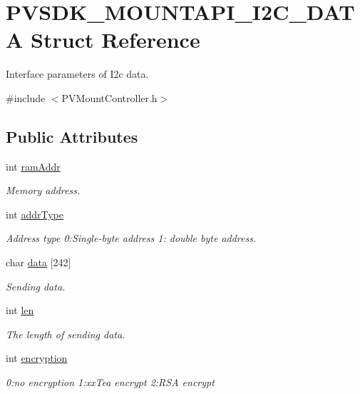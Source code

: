 \hypertarget{struct_p_v_s_d_k___m_o_u_n_t_a_p_i___i2_c___d_a_t_a}{}\section{P\+V\+S\+D\+K\+\_\+\+M\+O\+U\+N\+T\+A\+P\+I\+\_\+\+I2\+C\+\_\+\+D\+A\+TA Struct Reference}
\label{struct_p_v_s_d_k___m_o_u_n_t_a_p_i___i2_c___d_a_t_a}


Interface parameters of I2c data.  




{\ttfamily \#include $<$P\+V\+Mount\+Controller.\+h$>$}

\subsection*{Public Attributes}
\begin{DoxyCompactItemize}
\item 
int \hyperlink{struct_p_v_s_d_k___m_o_u_n_t_a_p_i___i2_c___d_a_t_a_afbdc6b4d781b344d498188ac4315bd3d}{ram\+Addr}
\begin{DoxyCompactList}\small\item\em Memory address. \end{DoxyCompactList}\item 
int \hyperlink{struct_p_v_s_d_k___m_o_u_n_t_a_p_i___i2_c___d_a_t_a_acb04b2a9182f37705ed8d1b5d0a14650}{addr\+Type}
\begin{DoxyCompactList}\small\item\em Address type 0\+:Single-\/byte address 1\+: double byte address. \end{DoxyCompactList}\item 
char \hyperlink{struct_p_v_s_d_k___m_o_u_n_t_a_p_i___i2_c___d_a_t_a_a52b8f8fc42de1b508c4f1c2b254f7b1d}{data} \mbox{[}242\mbox{]}
\begin{DoxyCompactList}\small\item\em Sending data. \end{DoxyCompactList}\item 
int \hyperlink{struct_p_v_s_d_k___m_o_u_n_t_a_p_i___i2_c___d_a_t_a_a427fab0ebaaec826caf3a554dfc4f693}{len}
\begin{DoxyCompactList}\small\item\em The length of sending data. \end{DoxyCompactList}\item 
int \hyperlink{struct_p_v_s_d_k___m_o_u_n_t_a_p_i___i2_c___d_a_t_a_a4c19e771de15d007d9a4f0776989cada}{encryption}
\begin{DoxyCompactList}\small\item\em 0\+:no encryption 1\+:xx\+Tea encrypt 2\+:R\+SA encrypt \end{DoxyCompactList}\end{DoxyCompactItemize}


